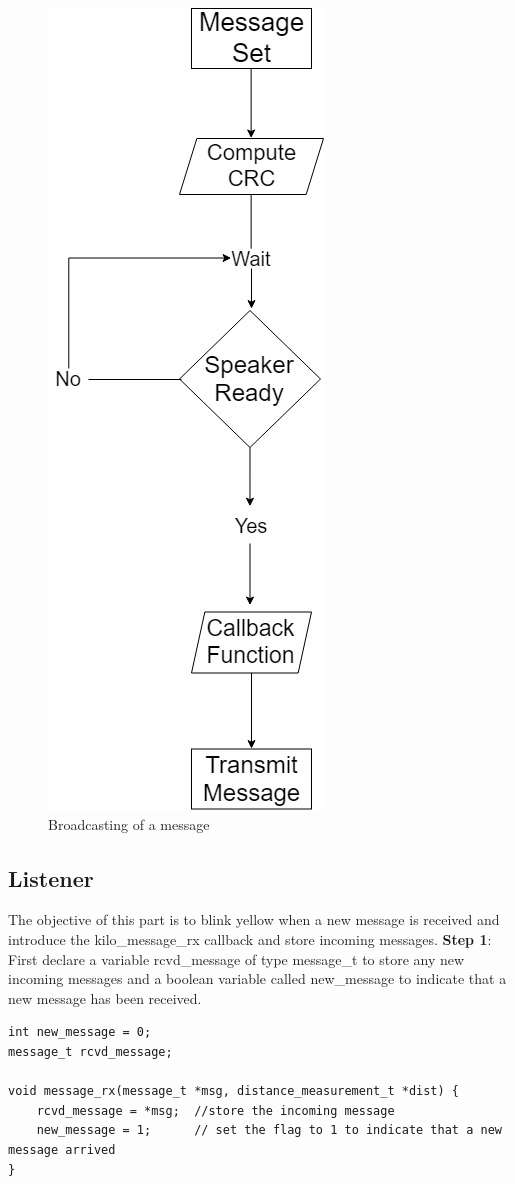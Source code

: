 \documentclass{report}[12pt]
\begin{document}
\begin{figure}[H]
\begin{center}
\includegraphics[scale=0.55]{speaker}
\caption{Broadcasting of a message}
\end{center}
\end{figure} 

\subsection{Listener}
The objective of this part is to blink yellow when a new message is received and introduce the kilo\_message\_rx callback and store incoming messages.
\newline
\newline
\noindent \textbf{Step 1}:
First declare a variable rcvd\_message of type message\_t to store any new incoming messages and a boolean variable called new\_message to indicate that a new message has been received.
\begin{verbatim}
int new_message = 0;
message_t rcvd_message;

void message_rx(message_t *msg, distance_measurement_t *dist) {
    rcvd_message = *msg;  //store the incoming message
    new_message = 1;      // set the flag to 1 to indicate that a new message arrived
}
\end{verbatim}
\end{document}
